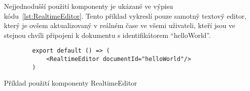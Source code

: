 Nejjednodušší použití komponenty je ukázané ve výpisu kódu~\ref{lst:RealtimeEditor}.
Tento příklad vykreslí pouze samotný textový editor, který je ovšem aktualizovaný v reálném čase ve všemi uživateli, kteří jsou ve stejnou chvíli připojeni k dokumentu s identifikátorem \enquote{helloWorld}.

\begin{listing}[ht]
    \begin{verbatim}
        export default () => (
            <RealtimeEditor documentId="helloWorld"/>
        )
    \end{verbatim}

    \caption{Příklad použití komponenty RealtimeEditor}\label{lst:RealtimeEditor}
\end{listing}



